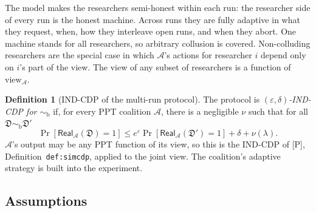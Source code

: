 \documentclass[11pt]{article}
\theoremstyle{definition}
\newtheorem{definition}{Definition}[section]
\theoremstyle{plain}
\newcommand{\view}{\mathrm{view}}
\newcommand{\bD}{\mathfrak D}
\newcommand{\Real}{\mathsf{Real}}
\newcommand{\simb}{\sim_{\mathrm b}}
\newcommand{\Pp}{\textup{[P]}}
\begin{document}
The model makes the researchers semi-honest within each run: the researcher side of every run is the honest machine. Across runs they are fully adaptive in what they request, when, how they interleave open runs, and when they abort. One machine stands for all researchers, so arbitrary collusion is covered. Non-colluding researchers are the special case in which $\mathcal A$'s actions for researcher $i$ depend only on $i$'s part of the view. The view of any subset of researchers is a function of $\view_{\mathcal A}$.

\begin{definition}[IND-CDP of the multi-run protocol]\label{def:indmulti}
The protocol is \emph{$(\varepsilon,\delta)$-IND-CDP for $\simb$} if, for every PPT coalition $\mathcal A$, there is a negligible $\nu$ such that for all $\bD\simb\bD'$
\[
  \Pr[\Real_{\mathcal A}(\bD)=1]\le e^\varepsilon\Pr[\Real_{\mathcal A}(\bD')=1]+\delta+\nu(\lambda).
\]
$\mathcal A$'s output may be any PPT function of its view, so this is the IND-CDP of \Pp, Definition~\texttt{def:simcdp}, applied to the joint view. The coalition's adaptive strategy is built into the experiment.
\end{definition}

\subsection{Assumptions}
\end{document}
